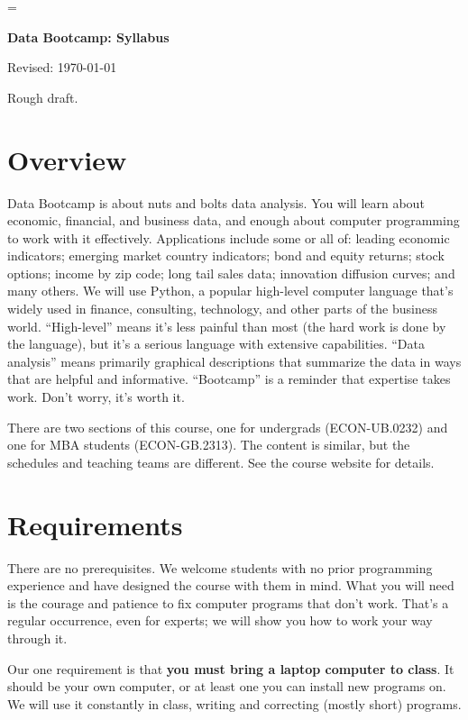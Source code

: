 \documentclass[11pt]{article}
\begin{document}
\parskip=\bigskipamount
\parindent=0.0in
\thispagestyle{empty}


\bigskip\bigskip
\centerline{\Large \bf Data Bootcamp:  Syllabus}
\centerline{Revised: \today}


Rough draft.

\section*{Overview}

Data Bootcamp is about nuts and bolts data analysis. You will learn about economic, financial, and business
data, and enough about computer programming to work with it effectively.
Applications include some or all of: leading economic indicators; emerging market country indicators;
bond and equity returns; stock options; income by zip code; long tail sales data; innovation diffusion curves; and many others.
We will use Python, a popular high-level computer language that's widely used in finance, consulting,
technology, and other parts of the business world.
``High-level'' means it's less painful than most (the hard work is done by the language),
but it's a serious language with extensive capabilities.
``Data analysis'' means primarily graphical descriptions that summarize the data
in ways that are helpful and informative.
``Bootcamp'' is a reminder that expertise takes work. Don't worry, it's worth it.

There are two sections of this course,
one for undergrads (ECON-UB.0232) and one for MBA students (ECON-GB.2313).
The content is similar, but the schedules and teaching teams are different.
See the course website for details.  


\section*{Requirements}

There are no prerequisites.
We welcome students with no prior programming experience and have designed the course with them in mind.
What you will need is the courage and patience to fix computer programs that don't work.
That's a regular occurrence, even for experts;
we will show you how to work your way through it.

Our one requirement is that {\bf you must bring a laptop computer to class\/}.
It should be your own computer, or at least one you can install new programs on.
We will use it constantly in class, writing and correcting (mostly short) programs.
\end{document}
